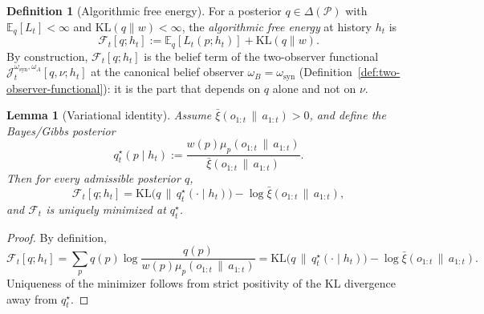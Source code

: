 \documentclass[11pt]{article}
\newtheorem{lemma}[theorem]{Lemma}
\theoremstyle{definition}
\newtheorem{definition}[theorem]{Definition}
\theoremstyle{remark}
\newcommand{\Pcal}{\mathcal{P}}
\newcommand{\Fcal}{\mathcal{F}}
\newcommand{\E}{\mathbb{E}}
\newcommand{\KL}{\mathrm{KL}}
\newcommand{\givena}{\,\|\,}
\newcommand{\barxi}{\bar{\xi}}
\begin{document}
\begin{definition}[Algorithmic free energy]
\label{def:afe}
For a posterior $q\in\Delta(\Pcal)$ with $\E_q[L_t]<\infty$ and $\KL(q\|w)<\infty$, the \emph{algorithmic free energy} at history $h_t$ is
\[
\Fcal_t[q;h_t]:=\E_q[L_t(p;h_t)]+\KL(q\|w).
\]
By construction, $\Fcal_t[q;h_t]$ is the belief term of the two-observer functional $\mathcal J_t^{\omega_{\mathrm{syn}},\omega_A}[q,\nu;h_t]$ at the canonical belief observer $\omega_B=\omega_{\mathrm{syn}}$ (Definition~\ref{def:two-observer-functional}): it is the part that depends on $q$ alone and not on $\nu$.
\end{definition}

\begin{lemma}[Variational identity]
\label{lem:variational}
Assume $\barxi(o_{1:t}\givena a_{1:t})>0$, and define the Bayes/Gibbs posterior
\[
q_t^\star(p\mid h_t):=\frac{w(p)\mu_p(o_{1:t}\givena a_{1:t})}{\barxi(o_{1:t}\givena a_{1:t})}.
\]
Then for every admissible posterior $q$,
\[
\Fcal_t[q;h_t]
=
\KL\!\bigl(q\,\|\,q_t^\star(\cdot\mid h_t)\bigr)-\log\barxi(o_{1:t}\givena a_{1:t}),
\]
and $\Fcal_t$ is uniquely minimized at $q_t^\star$.
\end{lemma}

\begin{proof}
By definition,
\[
\Fcal_t[q;h_t]=\sum_p q(p)\log\frac{q(p)}{w(p)\mu_p(o_{1:t}\givena a_{1:t})}
=\KL\!\bigl(q\,\|\,q_t^\star(\cdot\mid h_t)\bigr)-\log\barxi(o_{1:t}\givena a_{1:t}).
\]
Uniqueness of the minimizer follows from strict positivity of the KL divergence away from $q_t^\star$.
\end{proof}
\end{document}
